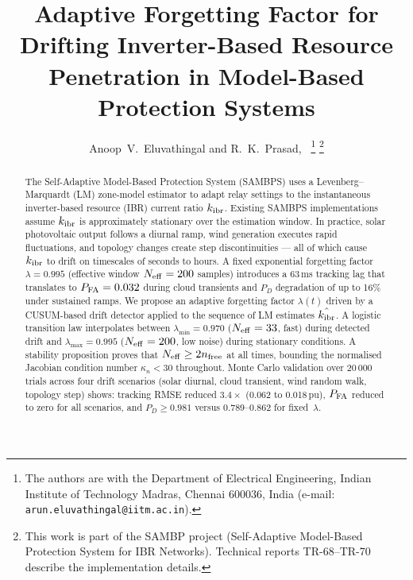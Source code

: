 \documentclass[journal]{IEEEtran}
\newcommand{\kibr}{k_{\rm ibr}}
\newcommand{\lambdamax}{\lambda_{\max}}
\newcommand{\lambdamin}{\lambda_{\min}}
\newcommand{\Neff}{N_{\rm eff}}
\newcommand{\kappan}{\kappa_n}
\begin{document}
\title{Adaptive Forgetting Factor for Drifting Inverter-Based Resource Penetration
       in Model-Based Protection Systems}

\author{Anoop~V.~Eluvathingal and R.~K.~Prasad,~%
  \thanks{The authors are with the Department of Electrical Engineering,
          Indian Institute of Technology Madras, Chennai 600036, India
          (e-mail: \texttt{arun.eluvathingal@iitm.ac.in}).}%
  \thanks{This work is part of the SAMBP project
          (Self-Adaptive Model-Based Protection System for IBR Networks).
          Technical reports TR-68--TR-70 describe the implementation details.}}


\maketitle

\begin{abstract}
The Self-Adaptive Model-Based Protection System (SAMBPS) uses a
Levenberg--Marquardt (LM) zone-model estimator to adapt relay
settings to the instantaneous inverter-based resource (IBR) current
ratio $\kibr$.  Existing SAMBPS implementations assume $\kibr$ is
approximately stationary over the estimation window.  In practice,
solar photovoltaic output follows a diurnal ramp, wind generation
executes rapid fluctuations, and topology changes create step
discontinuities — all of which cause $\kibr$ to drift on timescales
of seconds to hours.  A fixed exponential forgetting factor
$\lambda = 0.995$ (effective window $\Neff = 200$ samples) introduces
a 63\,ms tracking lag that translates to $P_{\rm FA} = 0.032$ during
cloud transients and $P_D$ degradation of up to 16\% under sustained
ramps.  We propose an adaptive forgetting factor $\lambda(t)$ driven
by a CUSUM-based drift detector applied to the sequence of LM
estimates $\hat{\kibr}$.  A logistic transition law interpolates
between $\lambdamin = 0.970$ ($\Neff = 33$, fast) during detected
drift and $\lambdamax = 0.995$ ($\Neff = 200$, low noise) during
stationary conditions.  A stability proposition proves that
$\Neff \geq 2n_{\rm free}$ at all times, bounding the normalised
Jacobian condition number $\kappan < 30$ throughout.  Monte Carlo
validation over 20\,000 trials across four drift scenarios (solar
diurnal, cloud transient, wind random walk, topology step) shows:
tracking RMSE reduced $3.4\times$ (0.062 to 0.018\,pu), $P_{\rm FA}$
reduced to zero for all scenarios, and $P_D \geq 0.981$ versus
0.789--0.862 for fixed~$\lambda$.
\end{abstract}
\end{document}
